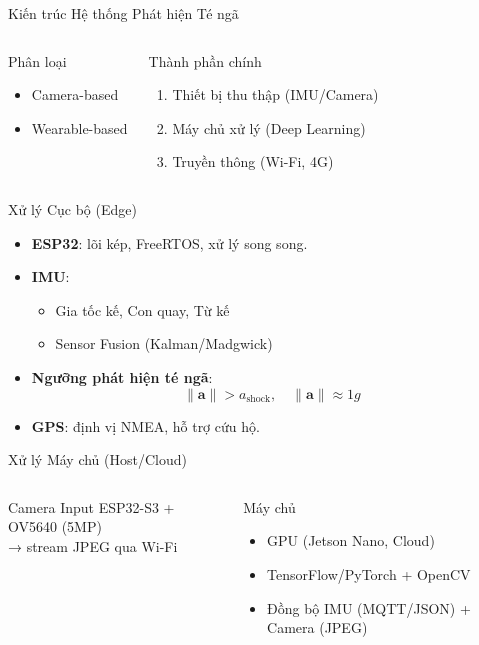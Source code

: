 \begin{frame}{Kiến trúc Hệ thống Phát hiện Té ngã}
\begin{columns}[T]
\begin{block}{Phân loại}
\begin{itemize}
    \item Camera-based
    \item Wearable-based
\end{itemize}
\end{block}
\begin{block}{Thành phần chính}
\begin{enumerate}
    \item Thiết bị thu thập (IMU/Camera)
    \item Máy chủ xử lý (Deep Learning)
    \item Truyền thông (Wi-Fi, 4G)
\end{enumerate}
\end{block}
\end{columns}
\end{frame}

\begin{frame}{Xử lý Cục bộ (Edge)}
\begin{itemize}
    \item \textbf{ESP32}: lõi kép, FreeRTOS, xử lý song song.
    \item \textbf{IMU}: 
    \begin{itemize}
        \item Gia tốc kế, Con quay, Từ kế
        \item Sensor Fusion (Kalman/Madgwick)
    \end{itemize}
    \item \textbf{Ngưỡng phát hiện té ngã}:
    \[
    \|\mathbf{a}\| > a_{\text{shock}}, \quad \|\mathbf{a}\| \approx 1g
    \]
    \item \textbf{GPS}: định vị NMEA, hỗ trợ cứu hộ.
\end{itemize}
\end{frame}

\begin{frame}{Xử lý Máy chủ (Host/Cloud)}
\begin{columns}[T]
\begin{block}{Camera Input}
ESP32-S3 + OV5640 (5MP) \\
→ stream JPEG qua Wi-Fi
\end{block}
\begin{block}{Máy chủ}
\begin{itemize}
    \item GPU (Jetson Nano, Cloud)
    \item TensorFlow/PyTorch + OpenCV
    \item Đồng bộ IMU (MQTT/JSON) + Camera (JPEG)
\end{itemize}
\end{block}
\end{columns}
\end{frame}

